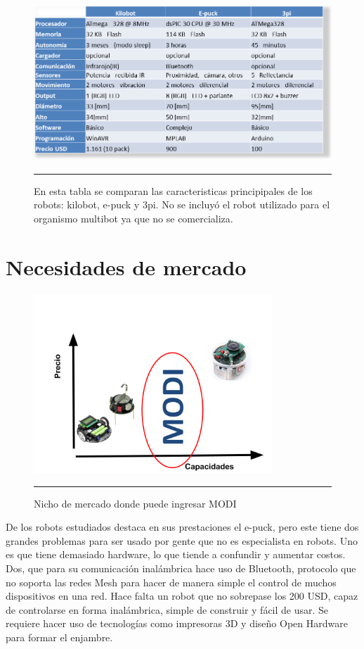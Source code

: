 \begin{figure}[htbp]
	\centering
		\includegraphics[width=1\textwidth]{./Figures/tabla_robots.png}
		\rule{35em}{0.5pt}
	\caption[Tabla comparativa robots]{En esta tabla se comparan las caracteristicas principipales de los robots: kilobot, e-puck y 3pi. No se incluyó el robot utilizado para el organismo multibot ya que no se comercializa.}
	\label{fig:Tabla robots}
\end{figure}

\section{Necesidades de mercado}
\begin{figure}[htbp]
	\centering
		\includegraphics[width=0.8\textwidth]{./Figures/nicho.png}
		\rule{35em}{0.5pt}
	\caption[Nicho de mercado]{Nicho de mercado donde puede ingresar MODI}
	\label{fig:nicho}
\end{figure}

De los robots estudiados destaca en sus prestaciones el e-puck, pero este tiene dos grandes problemas para ser usado por gente que no es especialista en robots. Uno es que tiene demasiado hardware, lo que tiende a confundir y aumentar costos. Dos, que para su comunicación inalámbrica hace uso de Bluetooth, protocolo que no soporta las redes Mesh para hacer de manera simple el control de muchos dispositivos en una red. Hace falta un robot que no sobrepase los 200 USD, capaz de controlarse en forma inalámbrica, simple de construir y fácil de usar. Se requiere hacer uso de tecnologías como impresoras 3D y diseño Open Hardware para formar el enjambre.


